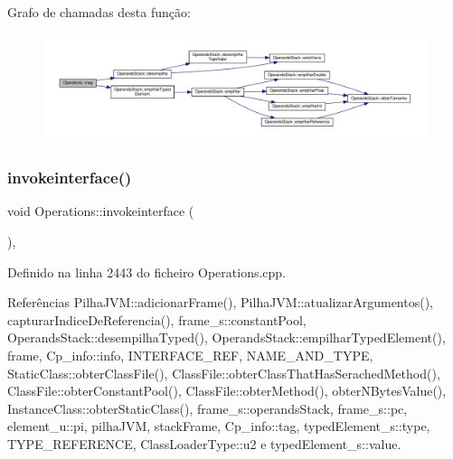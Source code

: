 Grafo de chamadas desta função\+:
\nopagebreak
\begin{figure}[H]
\begin{center}
\leavevmode
\includegraphics[width=350pt]{classOperations_a819d5dd66c64a6801a1599b5abf81ae7_cgraph}
\end{center}
\end{figure}
\mbox{\label{classOperations_a9206595fad5d3ac24514b2dfd6a013da}} 
\subsubsection{\texorpdfstring{invokeinterface()}{invokeinterface()}}
{\footnotesize\ttfamily void Operations\+::invokeinterface (\begin{DoxyParamCaption}{ }\end{DoxyParamCaption})\hspace{0.3cm}{\ttfamily [static]}, {\ttfamily [private]}}



Definido na linha 2443 do ficheiro Operations.\+cpp.



Referências Pilha\+J\+V\+M\+::adicionar\+Frame(), Pilha\+J\+V\+M\+::atualizar\+Argumentos(), capturar\+Indice\+De\+Referencia(), frame\+\_\+s\+::constant\+Pool, Operands\+Stack\+::desempilha\+Typed(), Operands\+Stack\+::empilhar\+Typed\+Element(), frame, Cp\+\_\+info\+::info, I\+N\+T\+E\+R\+F\+A\+C\+E\+\_\+\+R\+EF, N\+A\+M\+E\+\_\+\+A\+N\+D\+\_\+\+T\+Y\+PE, Static\+Class\+::obter\+Class\+File(), Class\+File\+::obter\+Class\+That\+Has\+Serached\+Method(), Class\+File\+::obter\+Constant\+Pool(), Class\+File\+::obter\+Method(), obter\+N\+Bytes\+Value(), Instance\+Class\+::obter\+Static\+Class(), frame\+\_\+s\+::operands\+Stack, frame\+\_\+s\+::pc, element\+\_\+u\+::pi, pilha\+J\+VM, stack\+Frame, Cp\+\_\+info\+::tag, typed\+Element\+\_\+s\+::type, T\+Y\+P\+E\+\_\+\+R\+E\+F\+E\+R\+E\+N\+CE, Class\+Loader\+Type\+::u2 e typed\+Element\+\_\+s\+::value.

